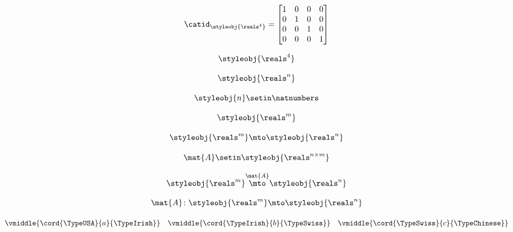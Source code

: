\begin{forslides}
    \begin{equation}
        \label{eq:semicats-slides-118}
        \catid_{\styleobj{\reals^4}} =
        \begin{bmatrix}
            1 & 0 & 0 & 0 \\
            0 & 1 & 0 & 0 \\
            0 & 0 & 1 & 0 \\
            0 & 0 & 0 & 1
        \end{bmatrix}
    \end{equation}

    \begin{equation}
        \label{eq:semicats-slides-119}
        \styleobj{\reals^4}
    \end{equation}

    \begin{equation}
        \label{eq:semicats-slides-120}
        \styleobj{\reals^n}
    \end{equation}

    \begin{equation}
        \label{eq:semicats-slides-121}
        \styleobj{n} \setin \natnumbers
    \end{equation}

    \begin{equation}
        \label{eq:semicats-slides-122}
        \styleobj{\reals^m}
    \end{equation}

    \begin{equation}
        \label{eq:semicats-slides-123}
        \styleobj{\reals^m} \mto \styleobj{\reals^n}
    \end{equation}

    \begin{equation}
        \label{eq:semicats-slides-124}
        \mat{A} \setin \styleobj{\reals^{n \times m}}
    \end{equation}

    \begin{equation}
        \label{eq:semicats-slides-125}
        \styleobj{\reals^m} \overset{\mat{A}}{\mto} \styleobj{\reals^n}
    \end{equation}

    \begin{equation}
        \label{eq:semicats-slides-126}
        \mat{A} \colon \styleobj{\reals^m} \mto \styleobj{\reals^n}
    \end{equation}

    \begin{equation}
        \label{eq:semicats-slides-127}
        \vmiddle{\cord{\TypeUSA}{a}{\TypeIrish}} \quad \vmiddle{\cord{\TypeIrish}{b}{\TypeSwiss}} \quad \vmiddle{\cord{\TypeSwiss}{c}{\TypeChinese}}
    \end{equation}


\end{forslides}
